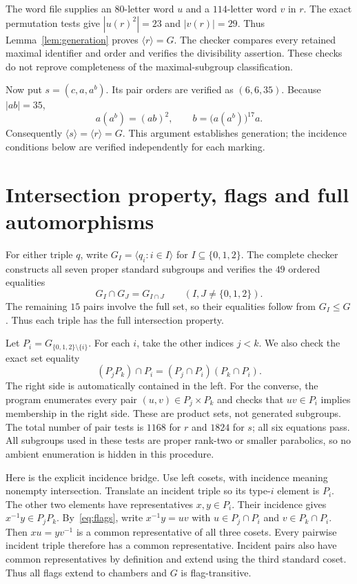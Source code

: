 \documentclass[11pt]{article}
\begin{document}
The word file supplies an $80$-letter word $u$ and a $114$-letter word $v$ in $r$. The exact permutation tests give $|u(r)^2|=23$ and $|v(r)|=29$. Thus Lemma~\ref{lem:generation} proves $\langle r\rangle=G$. The checker compares every retained maximal identifier and order and verifies the divisibility assertion. These checks do not reprove completeness of the maximal-subgroup classification.

Now put $s=(c,a,a^b)$. Its pair orders are verified as $(6,6,35)$. Because $|ab|=35$,
\[
 a(a^b)=(ab)^2,\qquad
 b=\bigl(a(a^b)\bigr)^{17}a.
\]
Consequently $\langle s\rangle=\langle r\rangle=G$. This argument establishes generation; the incidence conditions below are verified independently for each marking.
\section{Intersection property, flags and full automorphisms}
For either triple $q$, write $G_I=\langle q_i:i\in I\rangle$ for $I\subseteq\{0,1,2\}$. The complete checker constructs all seven proper standard subgroups and verifies the $49$ ordered equalities
\begin{equation}\label{eq:ip}
 G_I\cap G_J=G_{I\cap J}\qquad(I,J\ne\{0,1,2\}).
\end{equation}
The remaining $15$ pairs involve the full set, so their equalities follow from $G_I\leq G$. Thus each triple has the full intersection property.

Let $P_i=G_{\{0,1,2\}\setminus\{i\}}$. For each $i$, take the other indices $j<k$. We also check the exact set equality
\begin{equation}\label{eq:flags}
 (P_jP_k)\cap P_i=(P_j\cap P_i)(P_k\cap P_i).
\end{equation}
The right side is automatically contained in the left. For the converse, the program enumerates every pair $(u,v)\in P_j\times P_k$ and checks that $uv\in P_i$ implies membership in the right side. These are product sets, not generated subgroups. The total number of pair tests is $1168$ for $r$ and $1824$ for $s$; all six equations pass. All subgroups used in these tests are proper rank-two or smaller parabolics, so no ambient enumeration is hidden in this procedure.

Here is the explicit incidence bridge. Use left cosets, with incidence meaning nonempty intersection. Translate an incident triple so its type-$i$ element is $P_i$. The other two elements have representatives $x,y\in P_i$. Their incidence gives $x^{-1}y\in P_jP_k$. By~\eqref{eq:flags}, write $x^{-1}y=uv$ with $u\in P_j\cap P_i$ and $v\in P_k\cap P_i$. Then $xu=yv^{-1}$ is a common representative of all three cosets. Every pairwise incident triple therefore has a common representative. Incident pairs also have common representatives by definition and extend using the third standard coset. Thus all flags extend to chambers and $G$ is flag-transitive.
\end{document}

